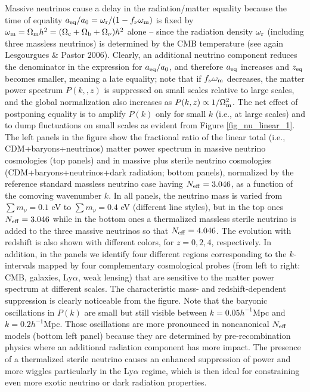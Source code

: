\documentclass{emulateapj}
\begin{document}
Massive neutrinos cause
a delay in the radiation/matter equality 
because the time of equality $a_{\rm eq} / a_0 = \omega_{\rm r} / (1-f_{\rm \nu} \omega_{\rm m})$
is fixed by $\omega_{\rm m} = \Omega_{\rm m} h^2 =(\Omega_{\rm c} + \Omega_{\rm b} + \Omega_{\nu})h^2$ alone -- since the radiation density $\omega_{\rm r}$ (including three massless neutrinos)
is determined by the CMB temperature (see again Lesgourgues \& Pastor 2006).
Clearly, an additional neutrino component reduces the denominator in the expression for $a_{\rm eq}/a_0$, and 
therefore $a_{\rm eq}$ increases and $z_{\rm eq}$ becomes smaller, meaning a late equality;
note that if $ f_{\nu} \omega_{\rm m}$ decreases, the matter power spectrum $P(k,,z)$ is suppressed on small scales relative to large scales, 
and the global normalization also increases as $P(k, z) \propto 1/\Omega_{\rm m}^2$.
The net effect of postponing equality is to amplify $P(k)$ only for small $k$ (i.e., at large scales) and to dump fluctuations on small scales as
evident from Figure \ref{fig_nu_linear_1}.
The left panels in the figure show the fractional
ratio of the linear total (i.e., CDM+baryons+neutrinos) matter power spectrum  in massive neutrino cosmologies (top panels)
and in massive plus sterile neutrino cosmologies (CDM+baryons+neutrinos+dark radiation; bottom panels), normalized by the reference standard massless  neutrino case having $N_{\rm eff}=3.046$, 
as a function of the comoving wavenumber $k$. 
In all panels, the neutrino mass is varied from $\sum m_{\nu}=0.1$ eV to $\sum m_{\nu}=0.4$ eV (different line styles), but in the top ones $N_{\rm eff} =3.046$
while in the bottom ones a thermalized massless sterile neutrino is added to the three massive neutrinos so that $N_{\rm eff} =4.046$. 
The evolution with redshift is also shown with different colors, for $z=0,2,4$, respectively.
In addition, in the panels we identify  four different regions corresponding to the $k$-intervals mapped by four complementary cosmological probes (from left to right: CMB, galaxies, Ly$\alpha$, weak lensing)
that are sensitive to 
the matter power spectrum at different scales.
The characteristic mass- and redshift-dependent suppression is clearly noticeable from the figure. 
Note that  the baryonic oscillations in $P(k)$ are small
but still visible between $k=0.05h^{-1}$Mpc and $k=0.2h^{-1}$Mpc.
Those oscillations are more pronounced in noncanonical $N_{\rm eff}$ models (bottom left panel) 
because they are determined by pre-recombination physics where an additional radiation component has more impact.  
The presence of a thermalized  sterile neutrino causes an enhanced suppression of power and more wiggles particularly in the Ly$\alpha$ regime,
which is then ideal for constraining even more exotic neutrino or dark radiation properties. 
 
\end{document}
